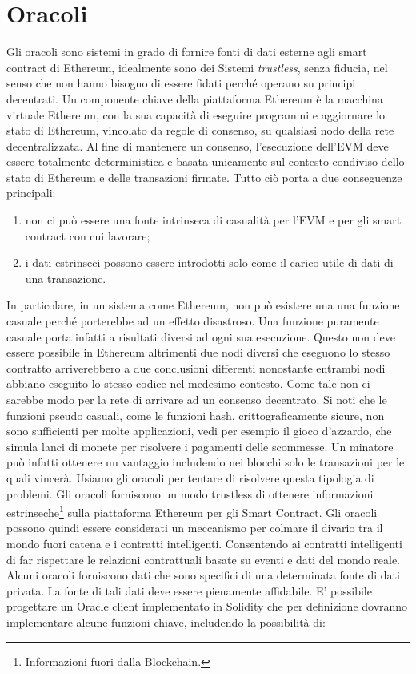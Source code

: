 \section{Oracoli}
Gli oracoli sono sistemi in grado di fornire fonti di dati esterne agli smart contract di Ethereum, idealmente sono dei Sistemi \textit{trustless}, senza fiducia, nel senso che non hanno bisogno di essere fidati perché operano su principi decentrati. Un componente chiave della piattaforma Ethereum è la macchina virtuale Ethereum, con la sua capacità di eseguire programmi e aggiornare lo stato di Ethereum, vincolato da regole di consenso, su qualsiasi nodo della rete decentralizzata. Al fine di mantenere un consenso, l'esecuzione dell'EVM deve essere totalmente deterministica e basata unicamente sul contesto condiviso dello stato di Ethereum e delle transazioni firmate. Tutto ciò porta a due conseguenze principali:
\begin{enumerate}
	\item non ci può essere una fonte intrinseca di casualità per l'EVM e per gli smart contract con cui lavorare;
	\item i dati estrinseci possono essere introdotti solo come il carico utile di dati di una transazione.
\end{enumerate}
In particolare, in un sistema come Ethereum, non può esistere una una funzione casuale perché porterebbe ad un effetto disastroso. Una funzione puramente casuale porta infatti a risultati diversi ad ogni sua esecuzione. Questo non deve essere possibile in Ethereum altrimenti due nodi diversi che eseguono lo stesso contratto arriverebbero a due conclusioni differenti nonostante entrambi nodi abbiano eseguito lo stesso codice nel medesimo contesto. Come tale non ci sarebbe modo per la rete di arrivare ad un consenso decentrato. Si noti che le funzioni pseudo casuali, come le funzioni hash, crittograficamente sicure, non sono sufficienti per molte applicazioni, vedi per esempio il gioco d'azzardo, che simula lanci di monete per risolvere i pagamenti delle scommesse. Un minatore può infatti ottenere un vantaggio includendo nei blocchi solo le transazioni per le quali vincerà. Usiamo gli oracoli per tentare di risolvere questa tipologia di problemi. Gli oracoli forniscono un modo trustless di ottenere informazioni estrinseche\footnote{Informazioni fuori dalla Blockchain.} sulla piattaforma Ethereum per gli Smart Contract. Gli oracoli possono quindi essere considerati un meccanismo per colmare il divario tra il mondo fuori catena e i contratti intelligenti. Consentendo ai contratti intelligenti di far rispettare le relazioni contrattuali basate su eventi e dati del mondo reale. Alcuni oracoli forniscono dati che sono specifici di una determinata fonte di dati privata. La fonte di tali dati deve essere pienamente affidabile. E' possibile progettare un Oracle client implementato in  Solidity che per definizione dovranno implementare alcune funzioni chiave, includendo la possibilità di:
